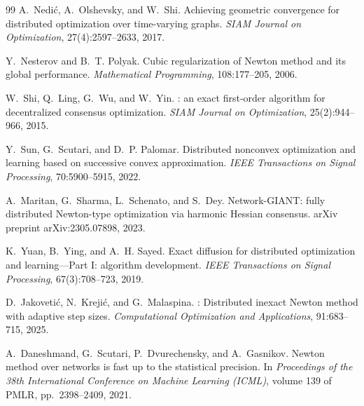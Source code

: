 \documentclass[review,onefignum,onetabnum]{siamart171218}
\begin{document}
\begin{thebibliography}{99}
		A.~Nedi{\'c}, A.~Olshevsky, and W.~Shi.
		\newblock Achieving geometric convergence for distributed optimization over time-varying graphs.
		\newblock \textit{SIAM Journal on Optimization}, 27(4):2597--2633, 2017.
		
		Y.~Nesterov and B.~T. Polyak.
		\newblock Cubic regularization of {N}ewton method and its global performance.
		\newblock \textit{Mathematical Programming}, 108:177--205, 2006.
		
		W.~Shi, Q.~Ling, G.~Wu, and W.~Yin.
		: an exact first-order algorithm for decentralized consensus optimization.
		\newblock \textit{SIAM Journal on Optimization}, 25(2):944--966, 2015.
		
		Y.~Sun, G.~Scutari, and D.~P. Palomar.
		\newblock Distributed nonconvex optimization and learning based on successive convex approximation.
		\newblock \textit{IEEE Transactions on Signal Processing}, 70:5900--5915, 2022.
		
		A.~Maritan, G.~Sharma, L.~Schenato, and S.~Dey.
		\newblock Network-{GIANT}: fully distributed {N}ewton-type optimization via harmonic {H}essian consensus.
		\newblock arXiv preprint arXiv:2305.07898, 2023.
		
		K.~Yuan, B.~Ying, and A.~H. Sayed.
		\newblock Exact diffusion for distributed optimization and learning---Part {I}: algorithm development.
		\newblock \textit{IEEE Transactions on Signal Processing}, 67(3):708--723, 2019.
		
		
		D.~Jakoveti{\'c}, N.~Kreji{\'c}, and G.~Malaspina.
		: Distributed inexact {N}ewton method with adaptive step sizes.
		\newblock \textit{Computational Optimization and Applications}, 91:683--715, 2025.
		
		A.~Daneshmand, G.~Scutari, P.~Dvurechensky, and A.~Gasnikov.
		\newblock Newton method over networks is fast up to the statistical precision.
		\newblock In \textit{Proceedings of the 38th International Conference on Machine Learning (ICML)}, volume 139 of PMLR, pp.~2398--2409, 2021.
		

\end{thebibliography}
\end{document}
